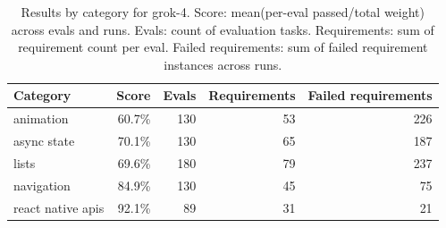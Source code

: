 \begin{table}[htbp]
\centering
\begin{tabular}{lrrrr}
\toprule
Category & Score & Evals & Requirements & Failed requirements \\
\midrule
animation & 60.7\% & 130 & 53 & 226 \\
async state & 70.1\% & 130 & 65 & 187 \\
lists & 69.6\% & 180 & 79 & 237 \\
navigation & 84.9\% & 130 & 45 & 75 \\
react native apis & 92.1\% & 89 & 31 & 21 \\
\bottomrule
\end{tabular}
\caption{Results by category for grok-4. Score: mean(per-eval passed/total weight) across evals and runs. Evals: count of evaluation tasks. Requirements: sum of requirement count per eval. Failed requirements: sum of failed requirement instances across runs.}
\end{table}
